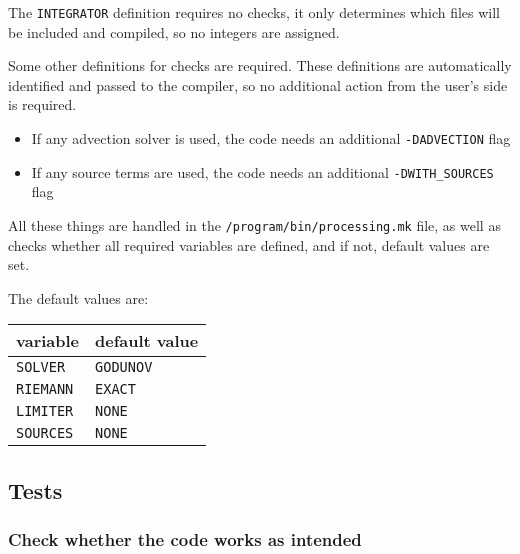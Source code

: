 The \texttt{INTEGRATOR} definition requires no checks, it only determines which files will be included and compiled, so no integers are assigned.



Some other definitions for checks are required.
These definitions are automatically identified and passed to the compiler, so no additional action from the user's side is required.

\begin{itemize}
	\item 	If any advection solver is used, the code needs an additional \texttt{-DADVECTION} flag
	\item 	If any source terms are used, the code needs an additional \texttt{-DWITH_SOURCES} flag
\end{itemize}



All these things are handled in the \texttt{/program/bin/processing.mk} file, as well as checks whether all required variables are defined, and if not, default values are set.

The default values are:

\begin{center}
\begin{tabular}{l l}

\textbf{variable}		&	\textbf{default value}		\\
\hline

\texttt{SOLVER}			&	\texttt{GODUNOV}			\\
\texttt{RIEMANN}		&	\texttt{EXACT}				\\
\texttt{LIMITER}		&	\texttt{NONE}				\\
\texttt{SOURCES}		&	\texttt{NONE}				\\
\end{tabular}
\end{center}










\subsection{Tests}

\subsubsection*{Check whether the code works as intended}


